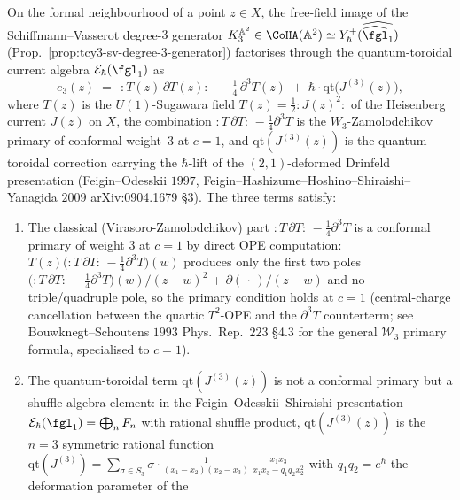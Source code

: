 \begin{proposition}%
\label{prop:SV-e3-sugawara-toroidal}%
On the formal neighbourhood of a point $z\in X$, the free-field image of the
Schiffmann--Vasserot degree-$3$ generator
$K_3^{\mathbb A^2}\in\CoHA(\mathbb A^2)\simeq Y^+_\hbar(\widehat{\widehat{\fgl}_1})$
(Prop.~\ref{prop:tcy3-sv-degree-3-generator}) factorises through the
quantum-toroidal current algebra $\mathcal E_\hbar(\fgl_1)$ as
\begin{equation}
\label{eq:SV-e3-sugawara-toroidal}
 e_3(z)
 \;=\;
 \, :\! T(z)\,\partial T(z)\!:\;
 -\;\tfrac{1}{4}\,\partial^3 T(z)\;
 +\;\hbar\cdot\mathrm{qt}\!\bigl(J^{(3)}(z)\bigr),
\end{equation}
where $T(z)$ is the $U(1)$-Sugawara field
$T(z) = \tfrac{1}{2}\!:\!J(z)^2\!:$ of the Heisenberg current $J(z)$
on $X$, the combination
$:\!T\,\partial T\!:\,-\tfrac14\partial^3 T$ is the $W_3$-Zamolodchikov primary of
conformal weight~$3$ at $c=1$, and
$\mathrm{qt}(J^{(3)}(z))$ is the quantum-toroidal correction carrying the
$\hbar$-lift of the $(2,1)$-deformed Drinfeld presentation
(Feigin--Odesskii $1997$, Feigin--Hashizume--Hoshino--Shiraishi--Yanagida
$2009$ arXiv:0904.1679 \S3). The three terms satisfy:
\begin{enumerate}[label=\textup{(\roman*)}]
\item The classical (Virasoro-Zamolodchikov) part
$:\!T\,\partial T\!:\,-\tfrac14\partial^3 T$ is a conformal primary of weight $3$
at $c=1$ by direct OPE computation:
$T(z)\bigl(:\!T\,\partial T\!:\,-\tfrac14\partial^3 T\bigr)(w)$
produces only the first two poles
$\bigl(:\!T\,\partial T\!:\,-\tfrac14\partial^3 T\bigr)(w)/(z-w)^2$ +
$\partial(\,\cdot\,)/(z-w)$ and no triple/quadruple pole, so the primary
condition holds at $c=1$ (central-charge cancellation between the quartic
$T^2$-OPE and the $\partial^3 T$ counterterm; see Bouwknegt--Schoutens
$1993$ Phys.\ Rep.\ $223$ \S4.3 for the general $\mathcal W_3$ primary
formula, specialised to $c=1$).
\item The quantum-toroidal term $\mathrm{qt}(J^{(3)}(z))$ is not a
conformal primary but a shuffle-algebra element: in the
Feigin--Odesskii--Shiraishi presentation
$\mathcal E_\hbar(\fgl_1) = \bigoplus_n F_n$ with rational shuffle
product, $\mathrm{qt}(J^{(3)}(z))$ is the $n=3$ symmetric rational function
$\mathrm{qt}(J^{(3)}) = \sum_{\sigma\in S_3}
\sigma\cdot\frac{1}{(x_1 - x_2)(x_2 - x_3)}\,
\frac{x_1 x_3}{x_1 x_3 - q_1 q_2 x_2^2}$
with $q_1 q_2 = e^{\hbar}$ the deformation parameter of the

\end{enumerate}
\end{proposition}
